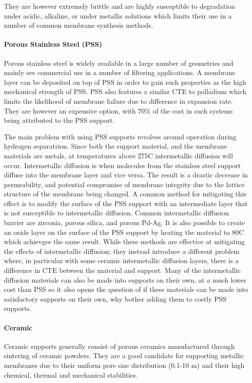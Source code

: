 They are however extremely brittle and are highly susceptible to degradation under acidic, alkaline, or under metallic solutions which limits their use in a number of common membrane synthesis methods. \cite{MUKHERJEE2007107}

\paragraph*{Porous Stainless Steel (PSS)}
Porous stainless steel is widely available in a large number of geometries and mainly see commercial use in a number of filtering applications. A membrane layer can be deposited on top of PSS in order to gain such properties as the high mechanical strength of PSS. PSS also features a similar CTE to palladium which limits the likelihood of membrane failure due to difference in expansion rate.  They are however an expensive option, with 70\% of the cost in such systems being attributed to the PSS support.

The main problem with using PSS supports revolves around operation during hydrogen separatrion. Since both the support material, and the membrane materials are metals, at temperatures above 275\textdegree C intermetallic diffusion will occur. Intermetallic diffusion is when molecules from the stainless steel support diffuse into the membrane layer and vice versa. The result is a drastic decrease in permeability, and potential compromise of membrane integrity due to the lattice structure of the membrane being changed. A common method for mitigating this effect is to modify the surface of the PSS support with an intermediate layer that is not susceptible to intermetallic diffusion. Common intermetallic diffusion barrier are zirconia, porous silica, and porous Pd-Ag.  \cite{Atsonios2015} It is also possible to create an oxide layer on the surface of the PSS support by heating the material to 80\textdegree C which achievges the same result. While these methods are effective at mitigating the effects of intermetallic diffusion; they instead introduce a different problem where, in particular with some ceramic intermetallic diffusion layers, there is a difference in CTE between the material and support. Many of the intermetallic diffusion materials can also be made into supports on their own, at a much lower cost than PSS so it also opens the question of if these materials can be made into satisfactory supports on their own, why bother adding them to costly PSS supports.

\paragraph*{Ceramic}
Ceramic supports generally consist of porous ceramics manufactured through sintering of ceramic powders. They are a good candidate for supporting metallic membranes due to their uniform pore size distribution (0.1-10 \textmu m) and their high chemical, thermal and mechanical stabilities. 

